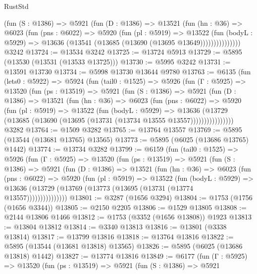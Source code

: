 \begin{lexlean}{RustStd}
\begin{coremodule}
{{              (fun (S : @1386) =>
              @5921
                (fun (D : @1386) =>
                @13521
                  (fun (hn : @36) =>
                  @6023
                    (fun (pns : @6022) =>
                    @5920
                      (fun (pl : @5919) =>
                      @13522
                        (fun (bodyL : @5929) =>
                        @13636 (@13541 (@13685 (@13690 (@13695 @13649)))))))))))))))
    @3242
@13724 := @13534 @3242
@13725 := @13724 @5913
@13729 := @5895 (@13530 (@13531 (@13533 @13725)))
@13730 := @5995 @3242
@13731 := @13591 @13730
@13734 := @5998 @13730 @13644 @9780
@13763 := @6135
    (fun (lets0 : @5922) =>
    @5924
      (fun (tail0 : @1525) =>
      @5926
        (fun (Γ : @5925) =>
        @13520
          (fun (ps : @13519) =>
          @5921
            (fun (S : @1386) =>
            @5921
              (fun (D : @1386) =>
              @13521
                (fun (hn : @36) =>
                @6023
                  (fun (pns : @6022) =>
                  @5920
                    (fun (pl : @5919) =>
                    @13522
                      (fun (bodyL : @5929) =>
                      @13636
                        (@13729
                          (@13685 (@13690 (@13695 (@13731 (@13734 @13555 @13557))))))))))))))))
    @3282
@13764 := @1509 @3282
@13765 := @13764 @13557
@13769 := @5895 (@13544 (@13681 @13765) @13565)
@13773 := @5895 (@6025 (@13686 @13765) @1442)
@13774 := @13734 @3282
@13799 := @6159
    (fun (tail0 : @1525) =>
    @5926
      (fun (Γ : @5925) =>
      @13520
        (fun (ps : @13519) =>
        @5921
          (fun (S : @1386) =>
          @5921
            (fun (D : @1386) =>
            @13521
              (fun (hn : @36) =>
              @6023
                (fun (pns : @6022) =>
                @5920
                  (fun (pl : @5919) =>
                  @13522
                    (fun (bodyL : @5929) =>
                    @13636 (@13729 (@13769 (@13773 (@13695 (@13731 (@13774 @13557)))))))))))))))
@13801 := @3287 (@1656 @3294)
@13804 := @1753 (@1756 (@1656 @3344))
@13805 := @2150 @2205
@13806 := @1529 @13805
@13808 := @2144 @13806 @1466
@13812 := @1753 (@3352 (@1656 @13808)) @1923
@13813 := @13804 @13812
@13814 := @3340 @13813
@13816 := @13801 (@3338 @13814)
@13817 := @13799 @13816
@13818 := @13764 @13816
@13822 := @5895 (@13544 (@13681 @13818) @13565)
@13826 := @5895 (@6025 (@13686 @13818) @1442)
@13827 := @13774 @13816
@13849 := @6177
    (fun (Γ : @5925) =>
    @13520
      (fun (ps : @13519) =>
      @5921
        (fun (S : @1386) =>
        @5921
}}
\end{coremodule}
\end{lexlean}

